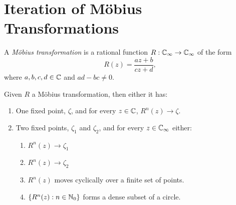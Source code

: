 \section{Iteration of Möbius Transformations}
\label{sec:iteration_of_mobius_transformations}

\begin{definition}
    A \emph{Möbius transformation} is a rational function $R: \mathbb{C}_\infty \to \mathbb{C}_\infty$
    of the form
    \begin{equation*} 
        R(z) = \frac{az+b}{cz+d},
    \end{equation*}
    where $a, b, c, d \in \mathbb{C}$ and $ad - bc \neq 0$.
\end{definition}

\begin{theorem}
    Given $R$ a Möbius transformation, then either it has:
    \begin{enumerate}[label=(\roman*)]
        \item One fixed point, $\zeta$, and for every $z \in \mathbb{C}$, $R^n(z) \to
        \zeta$.
        \item Two fixed points, $\zeta_1$ and $\zeta_2$, and for every $z \in
        \mathbb{C}_\infty$ either:
        \begin{enumerate}
            \item $R^n(z) \to \zeta_1$
            \item $R^n(z) \to \zeta_2$
            \item $R^n(z)$ moves cyclically over a finite set of points.
            \item $\{R^n(z) : n \in \mathbb{N}_0\}$ forms a dense subset of a circle.
        \end{enumerate}
    \end{enumerate}
\end{theorem}

